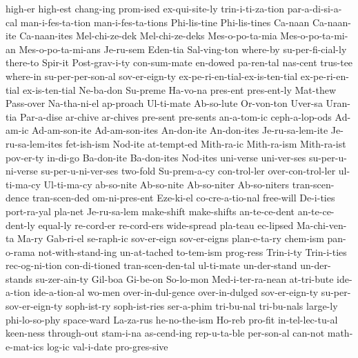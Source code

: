 {high-er
high-est
chang-ing
prom-ised
ex-qui-site-ly
trin-i-ti-za-tion
par-a-di-si-a-cal
man-i-fes-ta-tion
man-i-fes-ta-tions
Phi-lis-tine
Phi-lis-tines
Ca-naan
Ca-naan-ite
Ca-naan-ites
Mel-chi-ze-dek
Mel-chi-ze-deks
Mes-o-po-ta-mia
Mes-o-po-ta-mi-an
Mes-o-po-ta-mi-ans
Je-ru-sem
Eden-tia
Sal-ving-ton
where-by
su-per-fi-cial-ly
there-to
Spir-it
Post-grav-i-ty
con-sum-mate
en-dowed
pa-ren-tal
nas-cent
trus-tee
where-in
su-per-per-son-al
sov-er-eign-ty
ex-pe-ri-en-tial-ex-is-ten-tial
ex-pe-ri-en-tial
ex-is-ten-tial
Ne-ba-don
Su-preme
Ha-vo-na
pres-ent
pres-ent-ly
Mat-thew
Pass-over
Na-tha-ni-el
ap-proach
Ul-ti-mate
Ab-so-lute
Or-von-ton
Uver-sa
Uran-tia
Par-a-dise
ar-chive
ar-chives
pre-sent
pre-sents
an-a-tom-ic
ceph-a-lop-ods
Ad-am-ic
Ad-am-son-ite
Ad-am-son-ites
An-don-ite
An-don-ites
Je-ru-sa-lem-ite
Je-ru-sa-lem-ites
fet-ish-ism
Nod-ite
at-tempt-ed
Mith-ra-ic
Mith-ra-ism
Mith-ra-ist
pov-er-ty
in-di-go
Ba-don-ite
Ba-don-ites
Nod-ites
uni-verse
uni-ver-ses
su-per-u-ni-verse
su-per-u-ni-ver-ses
two-fold
Su-prem-a-cy
con-trol-ler
over-con-trol-ler
ul-ti-ma-cy
Ul-ti-ma-cy
ab-so-nite
Ab-so-nite
Ab-so-niter
Ab-so-niters
tran-scen-dence
tran-scen-ded
om-ni-pres-ent
Eze-ki-el
co-cre-a-tio-nal
free-will
De-i-ties
port-ra-yal
pla-net
Je-ru-sa-lem
make-shift
make-shifts
an-te-ce-dent
an-te-ce-dent-ly
equal-ly
re-cord-er
re-cord-ers
wide-spread
pla-teau
ec-lipsed
Ma-chi-ven-ta
Ma-ry
Gab-ri-el
se-raph-ic
sov-er-eign
sov-er-eigns
plan-e-ta-ry
chem-ism
pan-o-rama
not-with-stand-ing
un-at-tached
to-tem-ism
prog-ress
Trin-i-ty
Trin-i-ties
rec-og-ni-tion
con-di-tioned
tran-scen-den-tal
ul-ti-mate
un-der-stand
un-der-stands
su-zer-ain-ty
Gil-boa
Gi-be-on
So-lo-mon
Med-i-ter-ra-nean
at-tri-bute
ide-a-tion
ide-a-tion-al
wo-men
over-in-dul-gence
over-in-dulged
sov-er-eign-ty
su-per-sov-er-eign-ty
soph-ist-ry
soph-ist-ries
ser-a-phim
tri-bu-nal
tri-bu-nals
large-ly
phi-lo-so-phy
space-ward
La-za-rus
he-no-the-ism
Ho-reb
pro-fit
in-tel-lec-tu-al
keen-ness
through-out
stam-i-na
as-cend-ing
rep-u-ta-ble
per-son-al
can-not
math-e-mat-ics
log-ic
val-i-date
pro-gres-sive
}
